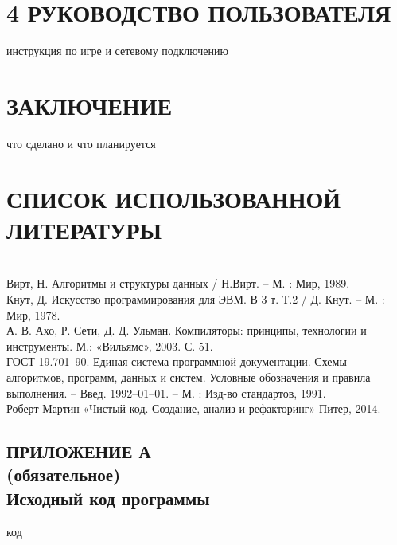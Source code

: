 \documentclass[14pt,a4paper]{extreport}
\begin{document}
	\newpage
	\section*{\normalsize\hspace{4ex}4 РУКОВОДСТВО ПОЛЬЗОВАТЕЛЯ}
	\hspace{4ex}инструкция по игре и сетевому подключению
	\newpage
	\section*{\center\normalsize ЗАКЛЮЧЕНИЕ \endcenter}
	\hspace{4ex}что сделано и что планируется
	\newpage
	\section*{\center\normalsize СПИСОК ИСПОЛЬЗОВАННОЙ ЛИТЕРАТУРЫ \endcenter}
	\hspace{4ex}
\\		Вирт, Н. Алгоритмы и структуры данных / Н.Вирт. – М. : Мир, 1989.
\\	Кнут, Д. Искусство программирования для ЭВМ. В 3 т.  Т.2 / Д. Кнут. – М. : Мир, 1978. 
\\	А. В. Ахо, Р. Сети, Д. Д. Ульман. Компиляторы: принципы, технологии и инструменты. М.: «Вильямс», 2003. С. 51.  
\\	ГОСТ 19.701–90. Единая система программной документации. Схемы алгоритмов, программ, данных и систем. Условные обозначения и правила выполнения. – Введ. 1992–01–01. – М. : Изд-во стандартов, 1991. 
\\	Роберт Мартин «Чистый код. Создание, анализ и рефакторинг» Питер, 2014.


	\begin{landscape}
	\newpage
	\section*{\center\normalsize ПРИЛОЖЕНИЕ А\\(обязательное)\\Исходный код программы \endcenter}
	код
	\end{landscape}
	
	
\end{document}
